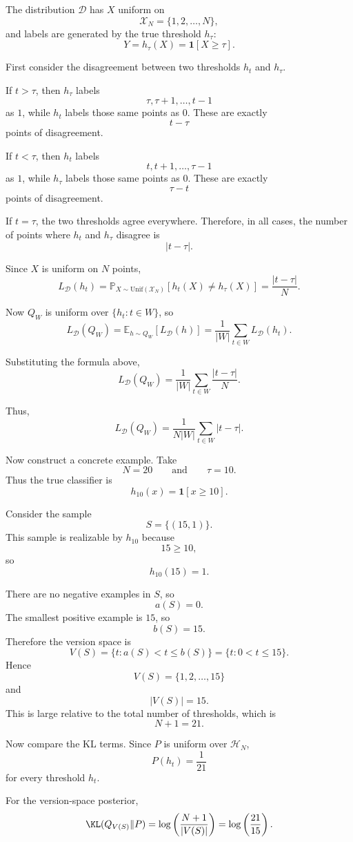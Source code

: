 \documentclass[11pt]{article}
\newcommand{\calD}{\mathcal{D}}
\newcommand{\calX}{\mathcal{X}}
\begin{document}
\begin{solutionbox}

The distribution $\calD$ has $X$ uniform on
\[
\calX_N=\{1,2,\dots,N\},
\]
and labels are generated by the true threshold $h_\tau$:
\[
Y=h_\tau(X)=\mathbf 1[X\ge \tau].
\]

First consider the disagreement between two thresholds $h_t$ and $h_\tau$.

If $t>\tau$, then $h_\tau$ labels
\[
\tau,\tau+1,\dots,t-1
\]
as $1$, while $h_t$ labels those same points as $0$. These are exactly
\[
t-\tau
\]
points of disagreement.

If $t<\tau$, then $h_t$ labels
\[
t,t+1,\dots,\tau-1
\]
as $1$, while $h_\tau$ labels those same points as $0$. These are exactly
\[
\tau-t
\]
points of disagreement.

If $t=\tau$, the two thresholds agree everywhere. Therefore, in all cases, the number of points where $h_t$ and $h_\tau$ disagree is
\[
|t-\tau|.
\]

Since $X$ is uniform on $N$ points,
\[
L_{\calD}(h_t)
=
\mathbb P_{X\sim \mathrm{Unif}(\calX_N)}[h_t(X)\neq h_\tau(X)]
=
\frac{|t-\tau|}{N}.
\]

Now $Q_W$ is uniform over $\{h_t:t\in W\}$, so
\[
L_{\calD}(Q_W)
=
\mathbb E_{h\sim Q_W}[L_{\calD}(h)]
=
\frac{1}{|W|}\sum_{t\in W}L_{\calD}(h_t).
\]

Substituting the formula above,
\[
L_{\calD}(Q_W)
=
\frac{1}{|W|}\sum_{t\in W}\frac{|t-\tau|}{N}.
\]

Thus,
\[
\boxed{
L_{\calD}(Q_W)
=
\frac{1}{N|W|}
\sum_{t\in W}|t-\tau|.
}
\]

Now construct a concrete example. Take
\[
N=20
\qquad\text{and}\qquad
\tau=10.
\]
Thus the true classifier is
\[
h_{10}(x)=\mathbf 1[x\ge 10].
\]

Consider the sample
\[
S=\{(15,1)\}.
\]
This sample is realizable by $h_{10}$ because
\[
15\ge 10,
\]
so
\[
h_{10}(15)=1.
\]

There are no negative examples in $S$, so
\[
a(S)=0.
\]
The smallest positive example is $15$, so
\[
b(S)=15.
\]
Therefore the version space is
\[
V(S)=\{t:a(S)<t\le b(S)\}
=
\{t:0<t\le 15\}.
\]
Hence
\[
V(S)=\{1,2,\dots,15\}
\]
and
\[
|V(S)|=15.
\]
This is large relative to the total number of thresholds, which is
\[
N+1=21.
\]

Now compare the KL terms. Since $P$ is uniform over $\mathcal H_N$,
\[
P(h_t)=\frac{1}{21}
\]
for every threshold $h_t$.

For the version-space posterior,
\[
\KL(Q_{V(S)}\|P)
=
\log\left(\frac{N+1}{|V(S)|}\right)
=
\log\left(\frac{21}{15}\right).
\]


\end{solutionbox}
\end{document}

